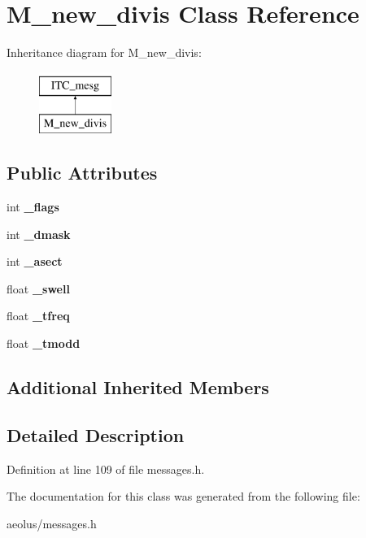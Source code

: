 \hypertarget{class_m__new__divis}{}\section{M\+\_\+new\+\_\+divis Class Reference}
\label{class_m__new__divis}
Inheritance diagram for M\+\_\+new\+\_\+divis\+:\begin{figure}[H]
\begin{center}
\leavevmode
\includegraphics[height=2.000000cm]{class_m__new__divis}
\end{center}
\end{figure}
\subsection*{Public Attributes}
\begin{DoxyCompactItemize}
\item 
\mbox{\label{class_m__new__divis_a4b2fe45fb9811dc1b3bbf9e8b830d545}} 
int {\bfseries \+\_\+flags}
\item 
\mbox{\label{class_m__new__divis_ab994fa0af1afd7c6719b941b875e5405}} 
int {\bfseries \+\_\+dmask}
\item 
\mbox{\label{class_m__new__divis_ab56b8975d0de7cf396ea52c0b7431fe4}} 
int {\bfseries \+\_\+asect}
\item 
\mbox{\label{class_m__new__divis_ada074a48e130e3b1fdb28b6e832d9f36}} 
float {\bfseries \+\_\+swell}
\item 
\mbox{\label{class_m__new__divis_af15d9f3cfd6571476534a21253a6324e}} 
float {\bfseries \+\_\+tfreq}
\item 
\mbox{\label{class_m__new__divis_a8e87478f20c7f29a3b9260ef9283f78f}} 
float {\bfseries \+\_\+tmodd}
\end{DoxyCompactItemize}
\subsection*{Additional Inherited Members}


\subsection{Detailed Description}


Definition at line 109 of file messages.\+h.



The documentation for this class was generated from the following file\+:\begin{DoxyCompactItemize}
\item 
aeolus/messages.\+h\end{DoxyCompactItemize}
